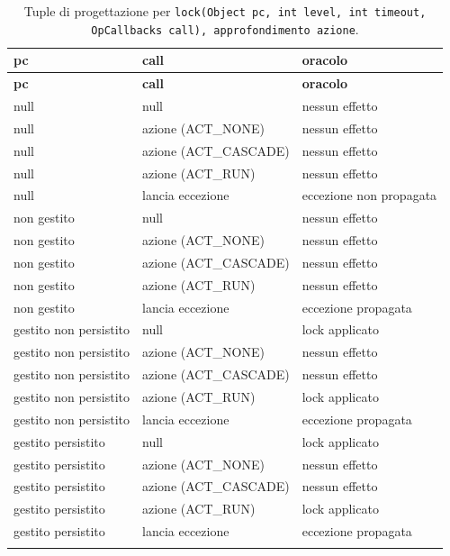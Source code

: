 {\footnotesize\setlength{\tabcolsep}{3pt}
\begin{longtable}{>{\raggedright\arraybackslash}p{}>{\raggedright\arraybackslash}p{}>{\raggedright\arraybackslash}p{}}
\toprule
\textbf{pc} & \textbf{call} & \textbf{oracolo} \\
\midrule
\endfirsthead
\toprule
\textbf{pc} & \textbf{call} & \textbf{oracolo} \\
\midrule
\endhead
\bottomrule
\endfoot
null & null & nessun effetto \\
null & azione (ACT\_NONE) & nessun effetto \\
null & azione (ACT\_CASCADE) & nessun effetto \\
null & azione (ACT\_RUN) & nessun effetto \\
null & lancia eccezione & eccezione non propagata \\
non gestito & null & nessun effetto \\
non gestito & azione (ACT\_NONE) & nessun effetto \\
non gestito & azione (ACT\_CASCADE) & nessun effetto \\
non gestito & azione (ACT\_RUN) & nessun effetto \\
non gestito & lancia eccezione & eccezione propagata \\
gestito non persistito & null & lock applicato \\
gestito non persistito & azione (ACT\_NONE) & nessun effetto \\
gestito non persistito & azione (ACT\_CASCADE) & nessun effetto \\
gestito non persistito & azione (ACT\_RUN) & lock applicato \\
gestito non persistito & lancia eccezione & eccezione propagata \\
gestito persistito & null & lock applicato \\
gestito persistito & azione (ACT\_NONE) & nessun effetto \\
gestito persistito & azione (ACT\_CASCADE) & nessun effetto \\
gestito persistito & azione (ACT\_RUN) & lock applicato \\
gestito persistito & lancia eccezione & eccezione propagata \\
\bottomrule
\caption{Tuple di progettazione per \texttt{lock(Object pc, int level, int timeout, OpCallbacks call), approfondimento azione}.}
\label{tab:lock2-tuple}
\end{longtable}
}



